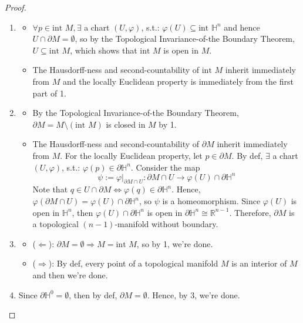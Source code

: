 \begin{proof}
    \begin{enumerate}
        \item \begin{itemize}
            \item $\forall p\in \text{int }M, \exists$ a chart $(U,\varphi)$, s.t.: $\varphi(U) \subseteq \text{int }\mathbb{H}^n$ and hence $U\cap \partial M=\emptyset$, so by the Topological Invariance-of-the Boundary Theorem, $U \subseteq \text{int }M$, which shows that $\text{int }M$ is open in $M$.
            \item The Hausdorff-ness and second-countability of $\text{int }M$ inherit immediately from $M$ and the locally Euclidean property is immediately from the first part of 1.
        \end{itemize}

        \item \begin{itemize}
            \item By the Topological Invariance-of-the Boundary Theorem, $\partial M= M\setminus (\text{int }M)$ is closed in $M$ by 1.
            \item The Hausdorff-ness and second-countability of $\partial M$ inherit immediately from $M$. For the locally Euclidean property, let $p\in \partial M$. By def, $\exists$ a chart $(U,\varphi)$, s.t.: $\varphi(p) \in \partial \mathbb{H}^n$. Consider the map
            \[
            \psi:= \varphi|_{\partial M\cap U}: \partial M\cap U\to \varphi(U) \cap \partial \mathbb{H}^n
            \]
            Note that $q \in U\cap \partial M \Leftrightarrow \varphi(q) \in \partial \mathbb{H}^n$. Hence, $\varphi(\partial M\cap U)= \varphi(U) \cap \partial \mathbb{H}^n$, so $\psi$ is a homeomorphism. Since $\varphi(U)$ is open in $\mathbb{H}^n$, then $\varphi(U) \cap \partial \mathbb{H}^n$ is open in $\partial \mathbb{H}^n \cong \mathbb{R}^{n-1}$. Therefore, $\partial M$ is a topological $(n-1)$-manifold without boundary.
        \end{itemize}

        \item \begin{itemize}
            \item ($\Leftarrow$): $\partial M=\emptyset\Rightarrow M= \text{int }M$, so by 1, we're done.
            \item ($\Rightarrow$): By def, every point of a topological manifold $M$ is an interior of $M$ and then we're done.
        \end{itemize}

        \item Since $\partial \mathbb{H}^0= \emptyset$, then by def, $\partial M=\emptyset$. Hence, by 3, we're done.
    \end{enumerate}
\end{proof}

